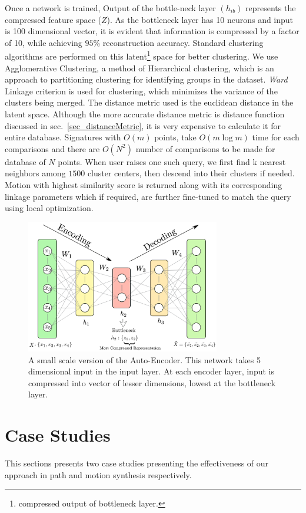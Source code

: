 \documentclass[twocolumn,10pt]{asme2e}
\begin{document}
Once a network is trained, Output of the bottle-neck layer $(h_{ib})$ represents the compressed feature space ($Z$).
As the bottleneck layer has 10 neurons and input is 100 dimensional vector, it is evident that information is compressed by a factor of 10, while achieving $95\%$ reconstruction accuracy.
Standard clustering algorithms are performed on this latent\footnote{compressed output of bottleneck layer.} space for better clustering\cite{song2013}.
We use Agglomerative Clustering, a method of Hierarchical clustering, which is an approach to partitioning clustering for identifying groups in the dataset.
\emph{Ward}\cite{ward1963} Linkage criterion is used for clustering, which minimizes the variance of the clusters being merged.
The distance metric used is the euclidean distance in the latent space.
Although the more accurate distance metric is distance function discussed in sec.~\ref{sec_distanceMetric}, it is very expensive to calculate it for entire database.
Signatures with ${O}(m)$ points, take ${O}(m\log{}m)$ time for each comparisons and there are ${O}(N^2)$ number of comparisons to be made for database of $N$ points.
When user raises one such query, we first find k nearest neighbors among $1500$ cluster centers, then descend into their clusters if needed.
Motion with highest similarity score is returned along with its corresponding linkage parameters which if required, are further fine-tuned to match the query using local optimization.

\begin{figure}
\centering
\includegraphics[width=240pt]{figure/fig_auto_encoder.eps}
  \caption{A small scale version of the Auto-Encoder. This network takes 5 dimensional input in the input layer. At each encoder layer, input is compressed into vector of lesser dimensions, lowest at the bottleneck layer.}
\label{autoEncoder}
\end{figure}


\section{Case Studies}\label{sec_example}
This sections presents two case studies presenting the effectiveness of our approach in path and motion synthesis respectively.
\end{document}
